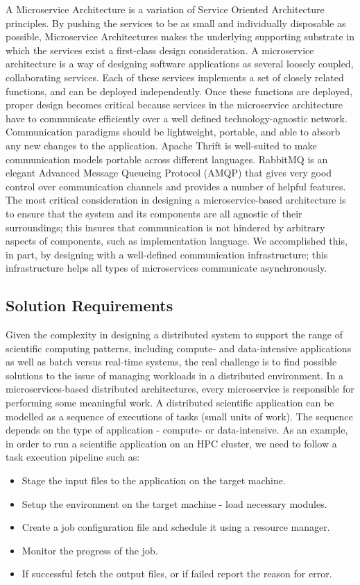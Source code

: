 \documentclass[review]{elsarticle}
\begin{document}
A Microservice Architecture is a variation of Service Oriented Architecture principles. By pushing the services to be as small and individually disposable as possible, Microservice Architectures makes the underlying supporting substrate in which the services exist a first-class design consideration. A microservice architecture is a way of designing software applications as several loosely coupled, collaborating services. Each of these services implements a set of closely related functions, and can be deployed independently. Once these functions are deployed, proper design becomes critical because services in the microservice architecture have to communicate efficiently over a well defined technology-agnostic network. Communication paradigms should be lightweight, portable, and able to absorb any new changes to the application. Apache Thrift is well-suited to make  communication models portable across different languages. RabbitMQ \cite{rabbitMQ} is an elegant Advanced Message Queueing Protocol (AMQP) that gives very good control over communication channels and provides a number of helpful features. The most critical consideration in designing a microservice-based architecture is to ensure that the system and its components are all agnostic of their surroundings; this insures that communication is not hindered by arbitrary aspects of components, such as implementation language. We accomplished this, in part, by designing with a well-defined communication infrastructure; this infrastructure helps all types of microservices communicate asynchronously.

\subsection{Solution Requirements}
Given the complexity in designing a distributed system to support the range of scientific computing patterns, including compute- and data-intensive applications as well as batch versus real-time systems, the real challenge is to find possible solutions to the issue of managing workloads in a distributed environment. In a microservices-based distributed architectures, every microservice is responsible for performing some meaningful work. A distributed scientific application can be modelled as a sequence of executions of tasks (small units of work). The sequence depends on the type of application - compute- or data-intensive. As an example, in order to run a scientific application on an HPC cluster, we need to follow a task execution pipeline such as:
\begin{itemize}
\item Stage the input files to the application on the target machine.
\item Setup the environment on the target machine - load necessary modules.
\item Create a job configuration file and schedule it using a resource manager.
\item Monitor the progress of the job.
\item If successful fetch the output files, or if failed report the reason for error.
\end{itemize}
\end{document}
